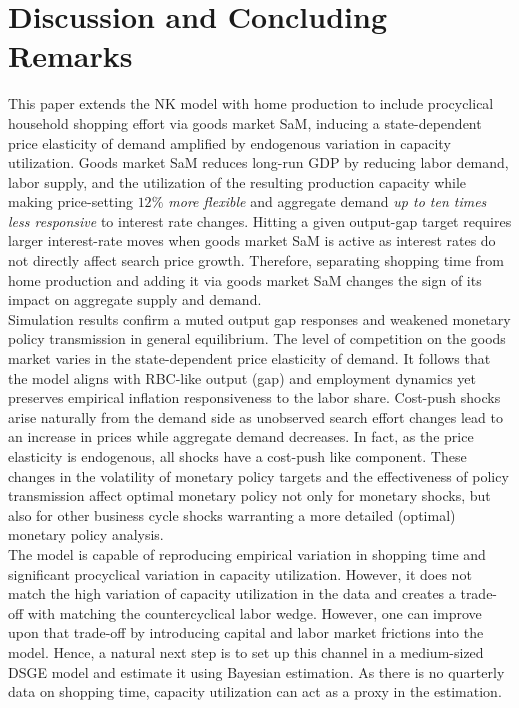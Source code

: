 \documentclass[12pt,3p,authoryear,review]{elsarticle}
\begin{document}
\section{Discussion and Concluding Remarks}\label{sec:conclusion}%
This paper extends the NK model with home production to include procyclical household shopping effort via goods market SaM, inducing a state-dependent price elasticity of demand amplified by endogenous variation in capacity utilization. Goods market SaM reduces long-run GDP by reducing labor demand, labor supply, and the utilization of the resulting production capacity while making price-setting \emph{$12\%$ more flexible} and aggregate demand \emph{up to ten times less responsive} to interest rate changes. Hitting a given output-gap target requires larger interest-rate moves when goods market SaM is active as interest rates do not directly affect search price growth. Therefore, separating shopping time from home production and adding it via goods market SaM changes the sign of its impact on aggregate supply and demand.\\%
Simulation results confirm a muted output gap responses and weakened monetary policy transmission in general equilibrium. The level of competition on the goods market varies in the state-dependent price elasticity of demand. It follows that the model aligns with RBC-like output (gap) and employment dynamics yet preserves empirical inflation responsiveness to the labor share. Cost-push shocks arise naturally from the demand side as unobserved search effort changes lead to an increase in prices while aggregate demand decreases. In fact, as the price elasticity is endogenous, all shocks have a cost-push like component. These changes in the volatility of monetary policy targets and the effectiveness of policy transmission affect optimal monetary policy not only for monetary shocks, but also for other business cycle shocks warranting a more detailed (optimal) monetary policy analysis.\\%
The model is capable of reproducing empirical variation in shopping time and significant procyclical variation in capacity utilization. However, it does not match the high variation of capacity utilization in the data and creates a trade-off with matching the countercyclical labor wedge. However, one can improve upon that trade-off by introducing capital and labor market frictions into the model. Hence, a natural next step is to set up this channel in a medium-sized DSGE model and estimate it using Bayesian estimation. As there is no quarterly data on shopping time, capacity utilization can act as a proxy in the estimation.\\%
\end{document}
